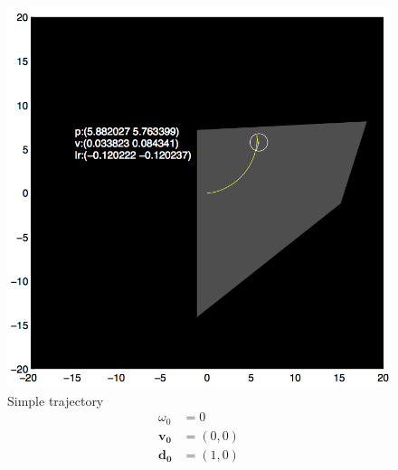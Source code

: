 \documentclass{report}
\begin{document}
\begin{figure}
\begin{minipage}{\linewidth}
\begin{minipage}[t]{0.45\linewidth}
    \centering
    \includegraphics[width=\linewidth]{fig1.png}
    \captionsetup{singlelinecheck=off}
    \caption[.]{\label{fig:fig1}Simple trajectory \begin{align*}
    \omega_0 &= 0 \\
    \mathbf{v_0} &= (0, 0)\\
    \mathbf{d_0} &= (1, 0)
    \end{align*}
    }
\end{minipage}
\hfill
\begin{minipage}[t]{0.45\linewidth}
    \centering
    

\end{minipage}
\end{minipage}
\end{figure}
\end{document}
